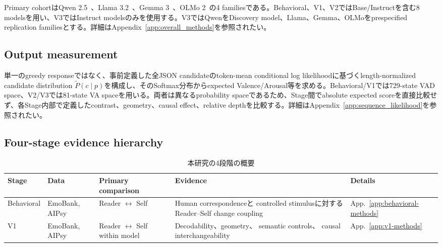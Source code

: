\documentclass{article} %
\begin{document}
\begin{CJK*}{UTF8}{min}
Primary cohortはQwen 2.5~\citep{qwen2025qwen25technicalreport}、Llama 3.2~\citep{grattafiori2024llama}、Gemma 3~\citep{team2025gemma}、OLMo 2~\citep{olmo20242,olmo20242olmo2furious}の4 familiesである。Behavioral、V1、V2ではBase/Instructを含む8 modelsを用い、V3ではInstruct modelsのみを使用する。V3ではQwenをDiscovery model、Llama、Gemma、OLMoをprespecified replication familiesとする。詳細はAppendix~\ref{app:overall_methods}を参照されたい。


\subsection{Output measurement}

単一のgreedy responseではなく、事前定義した全JSON candidateのtoken-mean conditional log likelihoodに基づくlength-normalized candidate distribution $\tilde{P}(c\mid p)$を構成し、そのSoftmax分布からexpected Valence/Arousal等を求める。Behavioral/V1では729-state VAD space、V2/V3では81-state VA spaceを用いる。両者は異なるprobability spaceであるため、Stage間でabsolute expected scoreを直接比較せず、各Stage内部で定義したcontrast、geometry、causal effect、relative depthを比較する。詳細はAppendix~\ref{app:sequence_likelihood}を参照されたい。


\subsection{Four-stage evidence hierarchy}

\begin{table}[t]
\centering
\small
\setlength{\tabcolsep}{3.5pt}
\renewcommand{\arraystretch}{1.08}
\caption{
本研究の4段階の概要
}
\label{tab:main-stage-overview}

\begin{tabularx}{\linewidth}{
@{}
>{\raggedright\arraybackslash}p{1.25cm}
>{\raggedright\arraybackslash}p{1.75cm}
>{\raggedright\arraybackslash}p{2.45cm}
>{\raggedright\arraybackslash}X
>{\centering\arraybackslash}p{1.15cm}
@{}
}
\toprule
\textbf{Stage} &
\textbf{Data} &
\textbf{Primary comparison} &
\textbf{Evidence} &
\textbf{Details} \\
\midrule

Behavioral &
EmoBank,
AIPsy &
Reader $\leftrightarrow$ Self &
Human correspondenceと
controlled stimulusに対する
Reader--Self change coupling &
App.~\ref{app:behavioral-methods} \\

V1 &
EmoBank,
AIPsy &
Reader $\leftrightarrow$ Self
within model &
Decodability、geometry、
semantic controls、
causal interchangeability &
App.~\ref{app:v1-methods} \\


\end{tabularx}
\end{table}
\end{CJK*}
\end{document}

